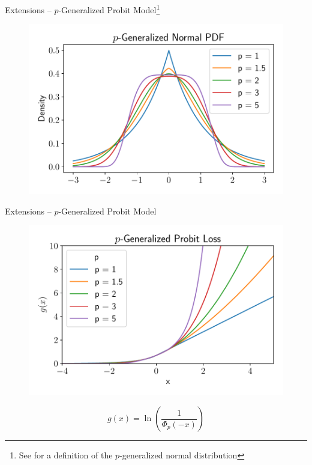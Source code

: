\documentclass[gray]{beamer}
\begin{document}
\begin{frame}{Extensions -- $p$-Generalized Probit
        Model\footnote{See \cite{KalkeR13} for a definition of the $p$-generalized normal distribution}}
    \begin{figure}[ht!]
        \centering
        \includegraphics[width=\linewidth]{../figures/p_gen_pdf.pdf}
    \end{figure}
\end{frame}

\begin{frame}{Extensions -- $p$-Generalized Probit Model}
    \begin{figure}[ht!]
        \centering
        \includegraphics[width=.95\linewidth]{../figures/probit_loss_p.pdf}
    \end{figure}
    \begin{equation*}
        g(x) = \ln\left(\frac{1}{\Phi_p(-x)}\right)
    \end{equation*}
\end{frame}
\end{document}
